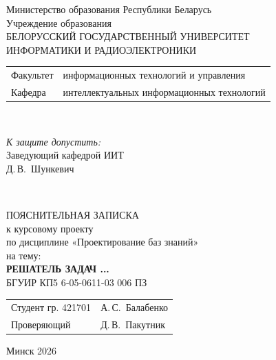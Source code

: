 \begin{titlepage}
  \begin{center}
    Министерство образования Республики Беларусь\\[1em]
    Учреждение образования\\
    БЕЛОРУССКИЙ ГОСУДАРСТВЕННЫЙ УНИВЕРСИТЕТ \\
    ИНФОРМАТИКИ И РАДИОЭЛЕКТРОНИКИ\\[1em]

    \begin{minipage}{\textwidth}
      \begin{flushleft}
        \begin{tabular}{ l l }
          Факультет & информационных технологий и управления\\
          Кафедра   & интеллектуальных информационных технологий
        \end{tabular}
      \end{flushleft}
    \end{minipage}\\[1em]

    \begin{flushright}
      \begin{minipage}{0.4\textwidth}
        \textit{К защите допустить:}\\[0.8em]
        Заведующий кафедрой ИИТ\\[0.45em]
        \underline{\hspace*{2.8cm}} Д.\,В.~Шункевич
      \end{minipage}\\[2.2em]
    \end{flushright}

    {ПОЯСНИТЕЛЬНАЯ ЗАПИСКА}\\
    {к курсовому проекту}\\
    {по дисциплине «Проектирование баз знаний»}\\
    {на тему:}\\[1em]
    \textbf{\large РЕШАТЕЛЬ ЗАДАЧ ...}\\[1em]


    {БГУИР КП5 6‑05-0611-03 006 ПЗ}\\[2em]
    \vspace{2em}
    \begin{tabular}{ p{}p{} }
      Студент гр. 421701 & А.\,С.~Балабенко \\
      Проверяющий & Д.\,В.~Пакутник \\
    \end{tabular}
    
    \vfill
    {\normalsize Минск 2026}
  \end{center}
\end{titlepage}
